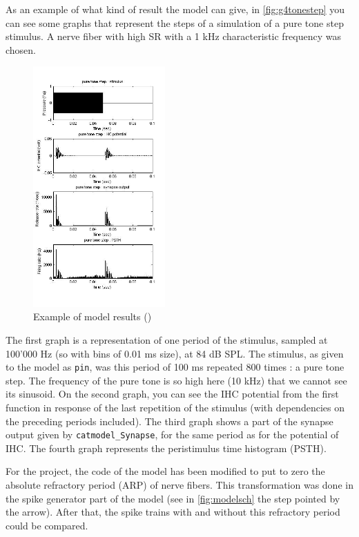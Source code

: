 As an example of what kind of result the model can give,
in \autoref{fig:g4tonestep} you can see some graphs that represent the steps of a 
simulation of a pure tone step stimulus.
A nerve fiber with high SR with a 1 kHz characteristic frequency 
was chosen.


\begin{figure}[h]
	\centering
	\includegraphics[width=0.45\textwidth]{images/g4-tonestep-column3.jpg}
	\caption{Example of model results (\cite{Model1})}
	\label{fig:g4tonestep}
\end{figure}

The first graph is a representation of one period of the stimulus, 
sampled at 100'000 Hz (so with bins of 0.01 ms size), at 84 dB SPL.
The stimulus, as given to the model as \texttt{pin}, was this period of 100 ms repeated 800
times : a pure tone step. 
The frequency of the pure tone is so high here (10 kHz) that we cannot see its sinusoid.
On the second graph, you can see the IHC potential from the first function
in response of the last repetition of the stimulus 
(with dependencies on the preceding periods included).
The third graph shows a part of the synapse output given by \texttt{catmodel\_Synapse}, 
for the same period as for the potential of IHC.
The fourth graph represents the peristimulus time histogram (PSTH).

For the project, the code of the model has been modified to put to zero 
the absolute refractory period (ARP) of nerve fibers. 
This transformation was done in the spike generator 
part of the model (see in \autoref{fig:modelsch} the step pointed by the arrow).
After that, the spike trains with and without this refractory period could be compared.

